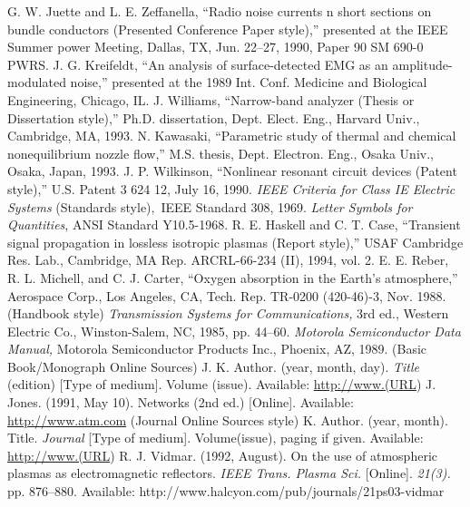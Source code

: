 \documentclass[transmag]{IEEEtran}
\begin{document}
\begin{thebibliography}{00}
 G. W. Juette and L. E. Zeffanella, ``Radio noise currents n short sections on bundle conductors (Presented Conference Paper style),'' presented at the IEEE Summer power Meeting, Dallas, TX, Jun. 22--27, 1990, Paper 90 SM 690-0 PWRS.
 J. G. Kreifeldt, ``An analysis of surface-detected EMG as an amplitude-modulated noise,'' presented at the 1989 Int. Conf. Medicine and Biological Engineering, Chicago, IL.
 J. Williams, ``Narrow-band analyzer (Thesis or Dissertation style),'' Ph.D. dissertation, Dept. Elect. Eng., Harvard Univ., Cambridge, MA, 1993. 
 N. Kawasaki, ``Parametric study of thermal and chemical nonequilibrium nozzle flow,'' M.S. thesis, Dept. Electron. Eng., Osaka Univ., Osaka, Japan, 1993.
 J. P. Wilkinson, ``Nonlinear resonant circuit devices (Patent style),'' U.S. Patent 3 624 12, July 16, 1990. 
 \emph{IEEE Criteria for Class IE Electric Systems} (Standards style)$,$ IEEE Standard 308, 1969.
 \emph{Letter Symbols for Quantities}, ANSI Standard Y10.5-1968.
 R. E. Haskell and C. T. Case, ``Transient signal propagation in lossless isotropic plasmas (Report style),'' USAF Cambridge Res. Lab., Cambridge, MA Rep. ARCRL-66-234 (II), 1994, vol. 2.
 E. E. Reber, R. L. Michell, and C. J. Carter, ``Oxygen absorption in the Earth's atmosphere,'' Aerospace Corp., Los Angeles, CA, Tech. Rep. TR-0200 (420-46)-3, Nov. 1988.
 (Handbook style) \emph{Transmission Systems for Communications,} 3rd ed., Western Electric Co., Winston-Salem, NC, 1985, pp. 44--60.
 \emph{Motorola Semiconductor Data Manual,} Motorola Semiconductor Products Inc., Phoenix, AZ, 1989.
 (Basic Book/Monograph Online Sources) J. K. Author. (year, month, day). \emph{Title} (edition) [Type of medium]. Volume (issue). Available: \underline {http://www.(URL})
 J. Jones. (1991, May 10). Networks (2nd ed.) [Online]. Available: \underline {http://www.atm.com}
 (Journal Online Sources style) K. Author. (year, month). Title. \emph{Journal} [Type of medium]. Volume(issue), paging if given. Available: \underline {http://www.(URL})
 R. J. Vidmar. (1992, August). On the use of atmospheric plasmas as electromagnetic reflectors. \emph{IEEE Trans. Plasma Sci.} [Online]. \emph{21(3).} pp. 876--880. Available: http://www.halcyon.com/pub/journals/21ps03-vidmar
\end{thebibliography}
\end{document}
